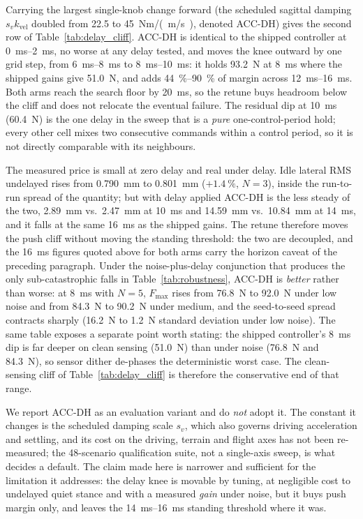 \documentclass[a4paper,fleqn]{cas-dc}
\begin{document}
Carrying the largest single-knob change forward (the scheduled sagittal damping $s_v k_{\text{vel}}$ doubled from \SI{22.5}{} to \SI{45}{Nm/(m/s)}, denoted ACC-DH) gives the second row of Table~\ref{tab:delay_cliff}. ACC-DH is identical to the shipped controller at \SIrange{0}{2}{ms}, no worse at any delay tested, and moves the knee outward by one grid step, from \SIrange{6}{8}{ms} to \SIrange{8}{10}{ms}: it holds \SI{93.2}{N} at \SI{8}{ms} where the shipped gains give \SI{51.0}{N}, and adds \SIrange{44}{90}{\percent} of margin across \SIrange{12}{16}{ms}. Both arms reach the search floor by \SI{20}{ms}, so the retune buys headroom below the cliff and does not relocate the eventual failure. The residual dip at \SI{10}{ms} (\SI{60.4}{N}) is the one delay in the sweep that is a \emph{pure} one-control-period hold; every other cell mixes two consecutive commands within a control period, so it is not directly comparable with its neighbours.

The measured price is small at zero delay and real under delay. Idle lateral RMS undelayed rises from \SI{0.790}{mm} to \SI{0.801}{mm} ($+\SI{1.4}{\percent}$, $N{=}3$), inside the run-to-run spread of the quantity; but with delay applied ACC-DH is the less steady of the two, \SI{2.89}{mm} vs.\ \SI{2.47}{mm} at \SI{10}{ms} and \SI{14.59}{mm} vs.\ \SI{10.84}{mm} at \SI{14}{ms}, and it falls at the same \SI{16}{ms} as the shipped gains. The retune therefore moves the push cliff without moving the standing threshold: the two are decoupled, and the \SI{16}{ms} figures quoted above for both arms carry the horizon caveat of the preceding paragraph. Under the noise-plus-delay conjunction that produces the only sub-catastrophic falls in Table~\ref{tab:robustness}, ACC-DH is \emph{better} rather than worse: at \SI{8}{ms} with $N{=}5$, $F_{\max}$ rises from \SI{76.8}{N} to \SI{92.0}{N} under low noise and from \SI{84.3}{N} to \SI{90.2}{N} under medium, and the seed-to-seed spread contracts sharply (\SI{16.2}{N} to \SI{1.2}{N} standard deviation under low noise). The same table exposes a separate point worth stating: the shipped controller's \SI{8}{ms} dip is far deeper on clean sensing (\SI{51.0}{N}) than under noise (\SI{76.8}{N} and \SI{84.3}{N}), so sensor dither de-phases the deterministic worst case. The clean-sensing cliff of Table~\ref{tab:delay_cliff} is therefore the conservative end of that range.

We report ACC-DH as an evaluation variant and do \emph{not} adopt it. The constant it changes is the scheduled damping scale $s_v$, which also governs driving acceleration and settling, and its cost on the driving, terrain and flight axes has not been re-measured; the \num{48}-scenario qualification suite, not a single-axis sweep, is what decides a default. The claim made here is narrower and sufficient for the limitation it addresses: the delay knee is movable by tuning, at negligible cost to undelayed quiet stance and with a measured \emph{gain} under noise, but it buys push margin only, and leaves the \SIrange{14}{16}{ms} standing threshold where it was.
\end{document}

